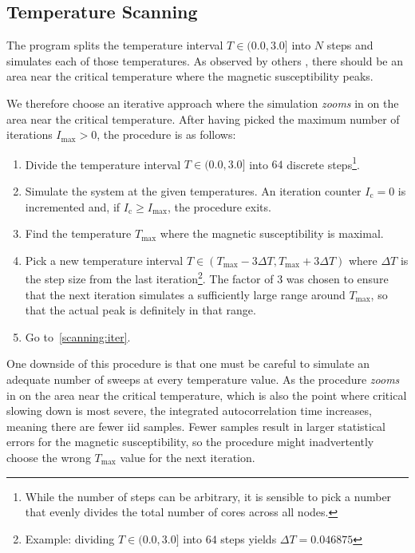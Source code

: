 \subsection{Temperature Scanning}\label{sec:impl:scanning}
	The program splits the temperature interval $T \in (0.0, 3.0]$ into $N$ steps and simulates each of those temperatures.  As observed by others \citep*{olsson_helicity}, there should be an area near the critical temperature where the magnetic susceptibility peaks.
	
	We therefore choose an iterative approach where the simulation \emph{zooms} in on the area near the critical temperature. After having picked the maximum number of iterations $I_\text{max} > 0$, the procedure is as follows:
	\begin{enumerate}
		\item \label{scanning:init} Divide the temperature interval $T \in (0.0, 3.0]$ into $64$ discrete steps\footnote{While the number of steps can be arbitrary, it is sensible to pick a number that evenly divides the total number of cores across all nodes.}.
		\item \label{scanning:iter} Simulate the system at the given temperatures. An iteration counter $I_\text{c} = 0$ is incremented and, if $I_\text{c} \geq I_\text{max}$, the procedure exits.
		\item Find the temperature $T_\text{max}$ where the magnetic susceptibility is maximal.
		\item Pick a new temperature interval $T \in (T_\text{max} - 3 \Delta T,  T_\text{max} + 3 \Delta T)$ where $\Delta T$ is the step size from the last iteration\footnote{Example: dividing $T \in (0.0, 3.0]$ into $64$ steps yields $\Delta T = \num{0.046875}$}. The factor of $3$ was chosen to ensure that the next iteration simulates a sufficiently large range around $T_\text{max}$, so that the actual peak is definitely in that range.
		\item Go to~\cref{scanning:iter}.
	\end{enumerate}
	One downside of this procedure is that one must be careful to simulate an adequate number of sweeps at every temperature value. As the procedure \emph{zooms} in on the area near the critical temperature, which is also the point where critical slowing down is most severe, the integrated autocorrelation time increases, meaning there are fewer iid samples. Fewer samples result in larger statistical errors for the magnetic susceptibility, so the procedure might inadvertently choose the wrong $T_\text{max}$ value for the next iteration.